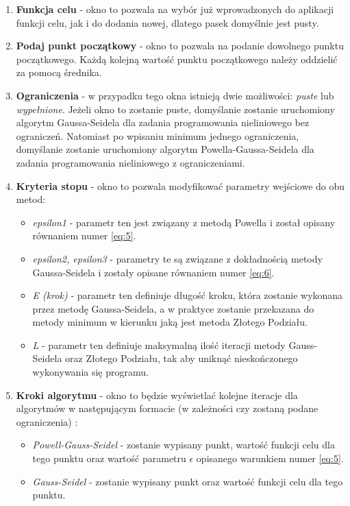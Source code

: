 \documentclass[a4paper,12pt]{article}
\begin{document}
\begin{enumerate}
    \item \textbf{Funkcja celu} - okno to pozwala na wybór już wprowadzonych do aplikacji funkcji celu, jak i do dodania nowej, dlatego pasek domyślnie jest pusty.
    \item \textbf{Podaj punkt początkowy} - okno to pozwala na podanie dowolnego punktu początkowego. Każdą kolejną wartość punktu początkowego należy oddzielić za pomocą średnika.
    \item \textbf{Ograniczenia} - w przypadku tego okna istnieją dwie możliwości: \textit{puste} lub \textit{wypełnione}. Jeżeli okno to zostanie puste, domyślanie zostanie uruchomiony algorytm Gaussa-Seidela dla zadania programowania nieliniowego bez ograniczeń. Natomiast po wpisaniu minimum jednego ograniczenia, domyślanie zostanie uruchomiony algorytm Powella-Gaussa-Seidela dla zadania programowania nieliniowego z ograniczeniami.
    \item \textbf{Kryteria stopu} - okno to pozwala modyfikować parametry wejściowe do obu metod:
        \begin{itemize}
            \item \textit{epsilon1} - parametr ten jest związany z metodą Powella i został opisany równaniem numer \ref{eq:5}.
            \item \textit{epsilon2, epsilon3} - parametry te są związane z dokładnością metody Gaussa-Seidela i zostały opisane równaniem numer \ref{eq:6}.
            \item \textit{E (krok)} - parametr ten definiuje długość kroku, która zostanie wykonana przez metodę Gaussa-Seidela, a w praktyce zostanie przekazana do metody minimum w kierunku jaką jest metoda Złotego Podziału.
            \item \textit{L} - parametr ten definiuje maksymalną ilość iteracji metody Gauss-Seidela oraz Złotego Podziału, tak aby uniknąć nieskończonego wykonywania się programu.
        \end{itemize}
    \item \textbf{Kroki algorytmu} - okno to będzie wyświetlać kolejne iteracje dla algorytmów w następującym formacie (w zależności czy zostaną podane ograniczenia) :
        \begin{itemize}
            \item \textit{Powell-Gauss-Seidel} - zostanie wypisany punkt, wartość funkcji celu dla tego punktu oraz wartość parametru $\epsilon$ opisanego warunkiem numer \ref{eq:5}.
            \item \textit{Gauss-Seidel} - zostanie wypisany punkt oraz wartość funkcji celu dla tego punktu.

\end{itemize}
\end{enumerate}
\end{document}
